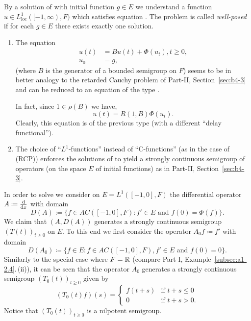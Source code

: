 By a solution of  with initial function $g \in E$ we understand a function $u \in L^{1}_{\mathrm{loc}}([-1,\infty),F)$ which satisfies equation .
The problem  is called \emph{well-posed} if for each $g \in E$ there exists exactly one solution.
\begin{remarks*}
\begin{enumerate}[\upshape (i), wide, labelindent=.25em] 
\item \label{rem:c4-kgk-1}
The equation
\begin{align*}
u(t) &= Bu(t) + \Phi(u_t), t \geq 0,\\
u_0 &= g,
\end{align*}
(where $B$ is the generator of a bounded semigroup on $F$) seems to be in better analogy to the retarded Cauchy problem of Part-II, Section~\ref{sec:b4-3} and can be reduced to an equation of the type .

In fact, since $1 \in \rho(B)$ we have,
\begin{equation*}\label{eq:c4-3.0-KGK1}
u(t) = R(1,B)\Phi(u_{t}).
\end{equation*}
Clearly, this equation is of the previous type (with a different \enquote{delay functional}).
\item \label{rem:c4-kgk-2}
The choice of \enquote{$L^{1}$-functions} instead of \enquote{C-functions} (as in the case of (RCP)) enforces the solutions of  to yield a strongly continuous semigroup of operators (on the space $E$ of initial functions) as in Part-II, Section~\ref{sec:b4-3}.
\end{enumerate}
\end{remarks*}
In order to solve  we consider on $E = L^{1}([-1,0],F)$ the differential operator $A \coloneq  \frac{\mathop{}\!\mathrm{d}{}}{\mathop{}\!\mathrm{d}{x}}$ with domain
\begin{equation*}\label{eq:c4-3.0-KGK2}
D(A):=\{f \in AC([-1,0],F) \colon f' \in E \text{ and } f(0) = \Phi(f)\}.
\end{equation*}
We claim that $(A,D(A))$ generates a strongly continuous semigroup $(T(t))_{t\geq 0}$ on $E$.
To this end we first consider the operator $A_0 f \coloneq f'$ with domain
\begin{equation*}\label{eq:c4-3.0-KGK3}
D(A_0) \coloneq \{f \in E \colon f \in AC([-1,0],F), f' \in E \text{ and } f(0) = 0\}.
\end{equation*}
Similarly to the special case where $F = \mathbb{R}$ (compare Part-I, Example~\ref{subsec:a1-2.4}.\,(ii)), it can be seen that the operator $A_0$ generates a strongly continuous semigroup $(T_0(t))_{t\geq 0}$ given by
\begin{equation}\label{eq:c4-3.1}
(T_0(t)f)(s) = \begin{cases}
    f(t+s) & \text{if } t+s \leq 0 \\
    0 & \text{if } t+s > 0.
\end{cases}
\end{equation}
Notice that $(T_0(t))_{t \geq 0}$ is a nilpotent semigroup.

